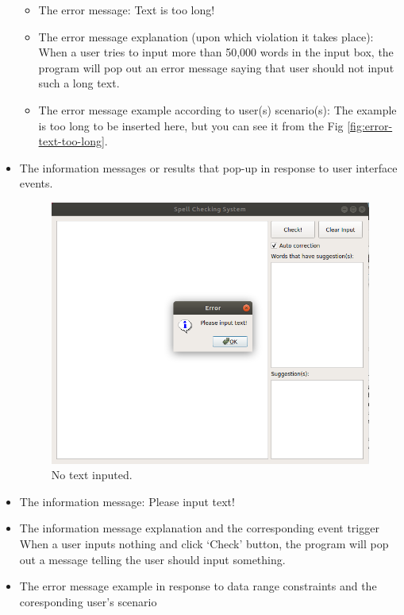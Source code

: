 \begin{itemize}
\begin{itemize}
	\item{The error message: Text is too long!}
	\item{The error message explanation (upon which violation it takes place): }
	When a user tries to input more than 50,000 words in the input box, the program will pop out an error message saying that user should not input such a long text.
	\item{The error message example according to user(s) scenario(s): }
	The example is too long to be inserted here, but you can see it from the Fig \ref{fig:error-text-too-long}.
	 \end{itemize}
\item{}
	The information messages or results that pop-up in response to user interface events.
	\begin{figure}[H]
		\centering
		\includegraphics[width=\linewidth]{fig/info-no-text.png}
		\caption{No text inputed.}
		\label{fig:info-no-text}
	\end{figure}
	\item{The information message: Please input text!}
	\item{The information message explanation and the corresponding event trigger }
	When a user inputs nothing and click `Check' button, the program will pop out a message telling the user should input something.
	\item{The error message example in response to data range constraints and the coresponding user's scenario }
	\begin{figure}[H]
		\centering

\end{figure}
\end{itemize}
